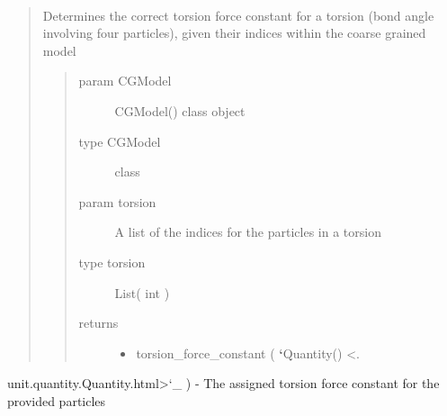 \documentclass[letterpaper,12pt,english,openany,oneside]{sphinxmanual}
\begin{document}
\begin{fulllineitems}
\begin{fulllineitems}
\begin{quote}
\begin{description}
\begin{itemize}
\end{itemize}


\end{description}\end{quote}

\end{fulllineitems}


\begin{fulllineitems}
\label{\detokenize{cg_model:cg_model.cgmodel.CGModel.get_torsion_force_constant}}~\begin{quote}

Determines the correct torsion force constant for a torsion (bond angle involving four particles), given their indices within the coarse grained model
\begin{quote}\begin{description}
\item[{param CGModel}] \leavevmode
CGModel() class object

\item[{type CGModel}] \leavevmode
class

\item[{param torsion}] \leavevmode
A list of the indices for the particles in a torsion

\item[{type torsion}] \leavevmode
List( int )

\item[{returns}] \leavevmode\begin{itemize}
\item {} 
torsion\_force\_constant ( {\color{red}\bfseries{}{}`}Quantity() \textless{}.

\end{itemize}

\end{description}\end{quote}
\end{quote}

unit.quantity.Quantity.html\textgreater{}{}`\_ ) - The assigned torsion force constant for the provided particles

\end{fulllineitems}


\end{fulllineitems}
\end{document}
